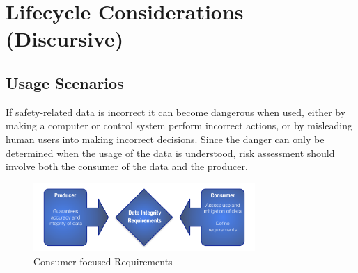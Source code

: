 %
%
\section{Lifecycle Considerations (Discursive)} \label{bkm:lifecycle}


\subsection{Usage Scenarios}
If safety-related data is incorrect it can become dangerous when used, either by making a computer or control system perform incorrect actions, or by misleading human users into making incorrect decisions. Since the danger can only be determined when the usage of the data is understood, risk assessment should involve both the consumer of the data and the producer.

\begin{figure}[htbp]
  \centering
  \includegraphics[width=0.75\textwidth]{images/producerconsumer}
  \caption{Consumer-focused  Requirements}
  \label{fig:producerconsumer}
\end{figure}

